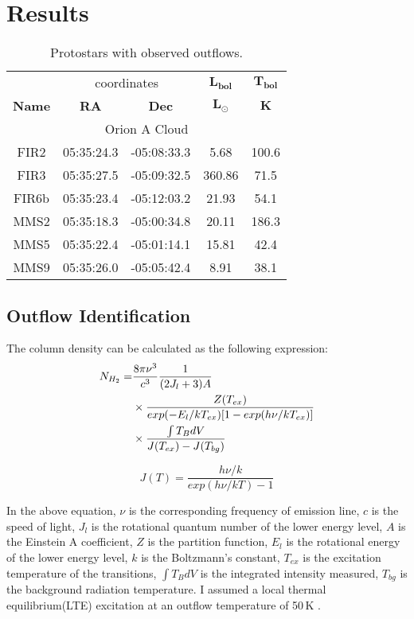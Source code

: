\section{Results}

\begin{table}[h!]
	\caption{Protostars with observed outflows.}
	\begin{center}
		\begin{tabular}{c|c|c|c|c}
			\toprule
			& \multicolumn{2}{c|}{coordinates} & $\mathbf{L_{bol}}$ & $\mathbf{T_{bol}}$\\
			\textbf{Name} & \textbf{RA} & \textbf{Dec} & $\mathbf{L_{\odot}}$ & $\mathbf{K}$\\
			\midrule
			\multicolumn{5}{c}{Orion A Cloud}\\
			\midrule
			\centering
			FIR2 & 05:35:24.3 & -05:08:33.3 & 5.68 & 100.6\\
			FIR3 & 05:35:27.5 & -05:09:32.5 & 360.86 & 71.5\\
			FIR6b & 05:35:23.4 & -05:12:03.2 & 21.93 & 54.1\\
			MMS2 & 05:35:18.3 & -05:00:34.8 & 20.11 & 186.3\\
			MMS5 & 05:35:22.4 & -05:01:14.1 & 15.81 & 42.4\\
			MMS9 & 05:35:26.0 & -05:05:42.4 & 8.91 & 38.1\\
			\midrule
		\end{tabular}
	\end{center}
\end{table}

\subsection{Outflow Identification}

The column density can be calculated as the following expression:
\begin{align}
N_{H_2} =& \frac{8\pi \nu^3}{c^3} \frac{1}{(2J_l +3)A}  \notag \\
& \times \frac{Z(T_{ex})}{exp(-E_l / kT_{ex})[1-exp(h\nu / kT_{ex})]} \notag \\
& \times \frac{\int T_B dV}{J(T_{ex})-J(T_{bg})}
\end{align}

\begin{equation}
	J(T) = \frac{h \nu / k}{exp(h\nu / kT)-1}
\end{equation}

In the above equation, $\nu$ is the corresponding frequency of emission line, $c$ is the speed of light, $J_l$ is the rotational quantum number of the lower energy level, $A$ is the Einstein A coefficient, $Z$ is the partition function, $E_l$ is the rotational energy of the lower energy level, $k$ is the Boltzmann's constant, $T_{ex}$ is the excitation temperature of the transitions, $\int T_B dV$ is the integrated intensity measured, $T_{bg}$ is the background radiation temperature. I assumed a local thermal equilibrium(LTE) excitation at an outflow temperature of 50$\,$K \cite{takahashi2008millimeter}.\\

